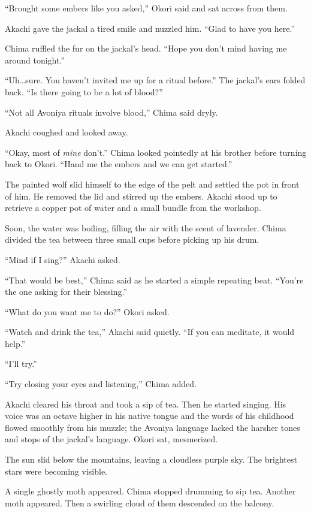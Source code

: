 ``Brought some embers like you asked,'' Okori said and sat across from them.

Akachi gave the jackal a tired smile and nuzzled him. ``Glad to have you here.''

Chima ruffled the fur on the jackal's head. ``Hope you don't mind having me around tonight.''

``Uh\ldots sure. You haven't invited me up for a ritual before.'' The jackal's ears folded back. ``Is there going to be a lot of blood?''

``Not all Avoniya rituals involve blood,'' Chima said dryly.

Akachi coughed and looked away.

``Okay, most of \emph{mine} don't.'' Chima looked pointedly at his brother before turning back to Okori. ``Hand me the embers and we can get started.''

The painted wolf slid himself to the edge of the pelt and settled the pot in front of him. He removed the lid and stirred up the embers. Akachi stood up to retrieve a copper pot of water and a small bundle from the workshop.

Soon, the water was boiling, filling the air with the scent of lavender. Chima divided the tea between three small cups before picking up his drum.

``Mind if I sing?'' Akachi asked.

``That would be best,'' Chima said as he started a simple repeating beat. ``You're the one asking for their blessing.''

``What do you want me to do?'' Okori asked. 

``Watch and drink the tea,'' Akachi said quietly. ``If you can meditate, it would help.''

``I'll try.''

``Try closing your eyes and listening,'' Chima added.

Akachi cleared his throat and took a sip of tea. Then he started singing. His voice was an octave higher in his native tongue and the words of his childhood flowed smoothly from his muzzle; the Avoniya language lacked the harsher tones and stops of the jackal's language. Okori sat, mesmerized.

The sun slid below the mountains, leaving a cloudless purple sky. The brightest stars were becoming visible.

A single ghostly moth appeared. Chima stopped drumming to sip tea. Another moth appeared. Then a swirling cloud of them descended on the balcony.


